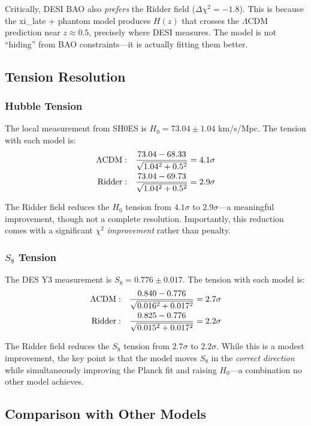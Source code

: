 \documentclass[twocolumn,showpacs,preprintnumbers,amsmath,amssymb,prd]{revtex4-2}
\begin{document}
Critically, DESI BAO also \textit{prefers} the Ridder field ($\Delta\chi^2 = -1.8$). This is because the xi\_late + phantom model produces $H(z)$ that crosses the $\Lambda$CDM prediction near $z \approx 0.5$, precisely where DESI measures. The model is not ``hiding'' from BAO constraints---it is actually fitting them better.

\subsection{Tension Resolution}

\subsubsection{Hubble Tension}

The local measurement from SH0ES is $H_0 = 73.04 \pm 1.04$ km/s/Mpc. The tension with each model is:
\begin{align}
\Lambda{\rm CDM}: \quad &\frac{73.04 - 68.33}{\sqrt{1.04^2 + 0.5^2}} = 4.1\sigma \\
{\rm Ridder}: \quad &\frac{73.04 - 69.73}{\sqrt{1.04^2 + 0.5^2}} = 2.9\sigma
\end{align}

The Ridder field reduces the $H_0$ tension from $4.1\sigma$ to $2.9\sigma$---a meaningful improvement, though not a complete resolution. Importantly, this reduction comes with a significant $\chi^2$ \textit{improvement} rather than penalty.

\subsubsection{$S_8$ Tension}

The DES Y3 measurement is $S_8 = 0.776 \pm 0.017$. The tension with each model is:
\begin{align}
\Lambda{\rm CDM}: \quad &\frac{0.840 - 0.776}{\sqrt{0.016^2 + 0.017^2}} = 2.7\sigma \\
{\rm Ridder}: \quad &\frac{0.825 - 0.776}{\sqrt{0.015^2 + 0.017^2}} = 2.2\sigma
\end{align}

The Ridder field reduces the $S_8$ tension from $2.7\sigma$ to $2.2\sigma$. While this is a modest improvement, the key point is that the model moves $S_8$ in the \textit{correct direction} while simultaneously improving the Planck fit and raising $H_0$---a combination no other model achieves.

\subsection{Comparison with Other Models}
\end{document}
